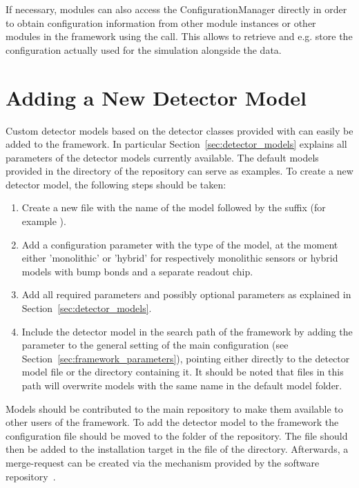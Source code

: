 If necessary, modules can also access the ConfigurationManager directly in order to obtain configuration information from other module instances or other modules in the framework using the  call.
This allows to retrieve and e.g. store the configuration actually used for the simulation alongside the data.

\section{Adding a New Detector Model}
\label{sec:adding_detector_model}
Custom detector models based on the detector classes provided with \apsq can easily be added to the framework.
In particular Section~\ref{sec:detector_models} explains all parameters of the detector models currently available.
The default models provided in the  directory of the repository can serve as examples.
To create a new detector model, the following steps should be taken:
\begin{enumerate}
\item Create a new file with the name of the model followed by the  suffix (for example ).
\item Add a configuration parameter  with the type of the model, at the moment either 'monolithic' or 'hybrid' for respectively monolithic sensors or hybrid models with bump bonds and a separate readout chip.
\item Add all required parameters and possibly optional parameters as explained in Section~\ref{sec:detector_models}.
\item Include the detector model in the search path of the framework by adding the  parameter to the general setting of the main configuration (see Section~\ref{sec:framework_parameters}), pointing either directly to the detector model file or the directory containing it. It should be noted that files in this path will overwrite models with the same name in the default model folder.
\end{enumerate}

Models should be contributed to the main repository to make them available to other users of the framework.
To add the detector model to the framework the configuration file should be moved to the  folder of the repository.
The file should then be added to the installation target in the  file of the  directory.
Afterwards, a merge-request can be created via the mechanism provided by the software repository~\cite{ap2-repo}.
